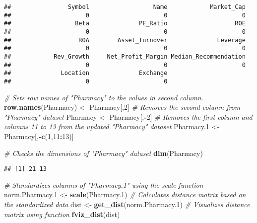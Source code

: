 \documentclass[
]{article}
\newenvironment{Shaded}{\begin{snugshade}}{\end{snugshade}}
\newcommand{\CommentTok}[1]{\textcolor[rgb]{0.56,0.35,0.01}{\textit{#1}}}
\newcommand{\DecValTok}[1]{\textcolor[rgb]{0.00,0.00,0.81}{#1}}
\newcommand{\FloatTok}[1]{\textcolor[rgb]{0.00,0.00,0.81}{#1}}
\newcommand{\FunctionTok}[1]{\textcolor[rgb]{0.13,0.29,0.53}{\textbf{#1}}}
\newcommand{\NormalTok}[1]{#1}
\newcommand{\OtherTok}[1]{\textcolor[rgb]{0.56,0.35,0.01}{#1}}
\newcommand{\SpecialCharTok}[1]{\textcolor[rgb]{0.81,0.36,0.00}{\textbf{#1}}}
\begin{document}
\begin{verbatim}
##                Symbol                  Name            Market_Cap 
##                     0                     0                     0 
##                  Beta              PE_Ratio                   ROE 
##                     0                     0                     0 
##                   ROA        Asset_Turnover              Leverage 
##                     0                     0                     0 
##            Rev_Growth     Net_Profit_Margin Median_Recommendation 
##                     0                     0                     0 
##              Location              Exchange 
##                     0                     0
\end{verbatim}

\begin{Shaded}
\begin{Highlighting}[]
\CommentTok{\# Sets row names of "Pharmacy" to the values in second column.}
\FunctionTok{row.names}\NormalTok{(Pharmacy) }\OtherTok{\textless{}{-}}\NormalTok{ Pharmacy[,}\DecValTok{2}\NormalTok{]}
\CommentTok{\# Removes the second column from "Pharmacy" dataset}
\NormalTok{Pharmacy }\OtherTok{\textless{}{-}}\NormalTok{ Pharmacy[,}\SpecialCharTok{{-}}\DecValTok{2}\NormalTok{]}
\CommentTok{\#  Removes the first column and columns 11 to 13 from the updated "Pharmacy" dataset}
\NormalTok{Pharmacy}\FloatTok{.1} \OtherTok{\textless{}{-}}\NormalTok{ Pharmacy[,}\SpecialCharTok{{-}}\FunctionTok{c}\NormalTok{(}\DecValTok{1}\NormalTok{,}\DecValTok{11}\SpecialCharTok{:}\DecValTok{13}\NormalTok{)]}
\end{Highlighting}
\end{Shaded}

\begin{Shaded}
\begin{Highlighting}[]
\CommentTok{\# Checks the dimensions of "Pharmacy" dataset}
\FunctionTok{dim}\NormalTok{(Pharmacy)}
\end{Highlighting}
\end{Shaded}

\begin{verbatim}
## [1] 21 13
\end{verbatim}

\begin{Shaded}
\begin{Highlighting}[]
\CommentTok{\# Standardizes columns of "Pharmacy.1" using the scale function}
\NormalTok{norm.Pharmacy}\FloatTok{.1} \OtherTok{\textless{}{-}} \FunctionTok{scale}\NormalTok{(Pharmacy}\FloatTok{.1}\NormalTok{)}
\CommentTok{\# Calculates distance matrix based on the standardized data}
\NormalTok{dist }\OtherTok{\textless{}{-}} \FunctionTok{get\_dist}\NormalTok{(norm.Pharmacy}\FloatTok{.1}\NormalTok{)}
\CommentTok{\# Visualizes distance matrix using function}
\FunctionTok{fviz\_dist}\NormalTok{(dist)}
\end{Highlighting}
\end{Shaded}
\end{document}
